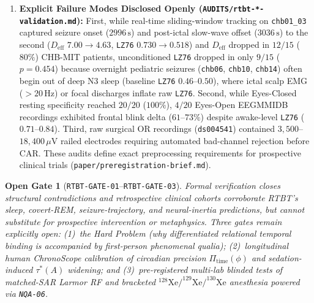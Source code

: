 \documentclass[11pt,letterpaper]{article}
\newtheorem{gate}[theorem]{Open Gate}
\newcommand{\code}[1]{\texttt{\small #1}}
\begin{document}
\begin{enumerate}
  \item \textbf{Explicit Failure Modes Disclosed Openly (\code{AUDITS/rtbt-*-validation.md}):} First, while real-time sliding-window tracking on \code{chb01\_03} captured seizure onset ($2996\,\mathrm{s}$) and post-ictal slow-wave offset ($3036\,\mathrm{s}$) to the second ($D_{\mathrm{eff}}$ $7.00 \to 4.63$, \code{LZ76} $0.730 \to 0.518$) and $D_{\mathrm{eff}}$ dropped in $12/15$ ($80\%$) CHB-MIT patients, unconditioned \code{LZ76} dropped in only $9/15$ ($p=0.454$) because overnight pediatric seizures (\code{chb06}, \code{chb10}, \code{chb14}) often begin out of deep N3 sleep (baseline \code{LZ76} $0.46$--$0.50$), where ictal scalp EMG ($>20\,\mathrm{Hz}$) or focal discharges inflate raw \code{LZ76}. Second, while Eyes-Closed resting specificity reached $20/20$ ($100\%$), $4/20$ Eyes-Open EEGMMIDB recordings exhibited frontal blink delta ($61$--$73\%$) despite awake-level \code{LZ76} ($0.71$--$0.84$). Third, raw surgical OR recordings (\code{ds004541}) contained $3{,}500$--$18{,}400\,\mu\mathrm{V}$ railed electrodes requiring automated bad-channel rejection before CAR. These audits define exact preprocessing requirements for prospective clinical trials (\code{paper/preregistration-brief.md}).
\end{enumerate}

\begin{gate}[\code{RTBT-GATE-01}--\code{RTBT-GATE-03}]
Formal verification closes structural contradictions and retrospective clinical cohorts corroborate RTBT's sleep, covert-REM, seizure-trajectory, and neural-inertia predictions, but cannot substitute for prospective intervention or metaphysics. Three gates remain explicitly open: (1)~the Hard Problem (why differentiated relational temporal binding is accompanied by first-person phenomenal qualia); (2)~longitudinal human \emph{ChronoScope} calibration of circadian precision $\Pi_{\mathrm{time}}(\phi)$ and sedation-induced $\tau^*(A)$ widening; and (3)~pre-registered multi-lab blinded tests of matched-SAR Larmor RF and bracketed $^{128}\mathrm{Xe}/^{129}\mathrm{Xe}/^{130}\mathrm{Xe}$ anesthesia powered via \code{NQA-06}.
\end{gate}
\end{document}
